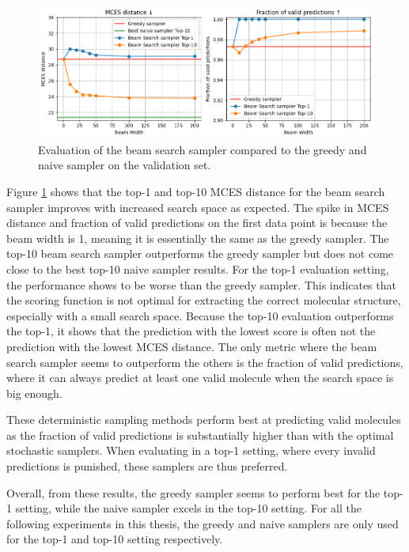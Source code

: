 \begin{figure}[h]
    \centering
    \includegraphics[width=1.0\textwidth]{figures/results/samplers/beam_search.png}
    \caption{Evaluation of the beam search sampler compared to the greedy and naive sampler on the validation set.}
    \label{fig:beam-search}
\end{figure}

Figure \ref{fig:beam-search} shows that the top-1 and top-10 MCES distance for the beam search sampler improves with increased search space as expected.
The spike in MCES distance and fraction of valid predictions on the first data point is because the beam width is 1, meaning it is essentially the same as the greedy sampler.
The top-10 beam search sampler outperforms the greedy sampler but does not come close to the best top-10 naive sampler results. 
For the top-1 evaluation setting, the performance shows to be worse than the greedy sampler.
This indicates that the scoring function is not optimal for extracting the correct molecular structure, especially with a small search space.
Because the top-10 evaluation outperforms the top-1, it shows that the prediction with the lowest score is often not the prediction with the lowest MCES distance.
The only metric where the beam search sampler seems to outperform the others is the fraction of valid predictions, where it can always predict at least one valid molecule when the search space is big enough.

These deterministic sampling methods perform best at predicting valid molecules as the fraction of valid predictions is substantially higher than with the optimal stochastic samplers.
When evaluating in a top-1 setting, where every invalid predictions is punished, these samplers are thus preferred.

Overall, from these results, the greedy sampler seems to perform best for the top-1 setting, while the naive sampler excels in the top-10 setting.
For all the following experiments in this thesis, the greedy and naive samplers are only used for the top-1 and top-10 setting respectively.


